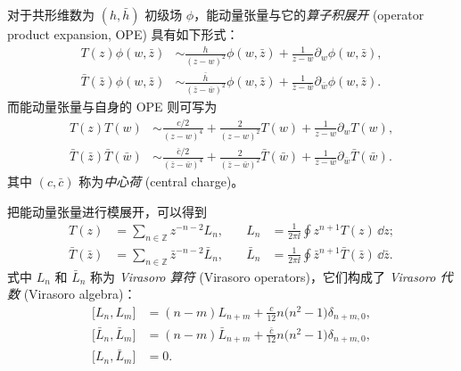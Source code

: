 对于共形维数为 $(h,\bar{h})$ 初级场 $\phi$，能动量张量与它的\emph{算子积展开} (operator product expansion, OPE) 具有如下形式：
\begin{equation}
  \begin{aligned}
    T(z) \phi(w,\bar{z}) &\sim
      \frac{h}{(z-w)^2} \phi(w,\bar{z}) + \frac{1}{z-w} \partial_w\phi(w,\bar{z}), \\
    \bar{T}(\bar{z}) \phi(w,\bar{z}) &\sim
      \frac{\bar{h}}{(\bar{z}-\bar{w})^2} \phi(w,\bar{z}) + \frac{1}{\bar{z}-\bar{w}} \partial_{\bar{w}}\phi(w,\bar{z}).
  \end{aligned}
  \label{eq:t-phi-ope}
\end{equation}
而能动量张量与自身的 OPE 则可写为
\begin{equation}
  \begin{aligned}
    T(z) T(w) &\sim
      \frac{c/2}{(z-w)^4} + \frac{2}{(z-w)^2} T(w) + \frac{1}{z-w} \partial_w T(w), \\
    \bar{T}(\bar{z}) \bar{T}(\bar{w}) &\sim
        \frac{\bar{c}/2}{(\bar{z}-\bar{w})^4}
      + \frac{2}{(\bar{z}-\bar{w})^2} \bar{T}(\bar{w})
      + \frac{1}{\bar{z}-\bar{w}} \partial_{\bar{w}}\bar{T}(\bar{w}).
  \end{aligned}
\end{equation}
其中 $(c,\bar{c})$ 称为\emph{中心荷} (central charge)。

把能动量张量进行模展开，可以得到
\begin{equation}
  \begin{aligned}
    T(z)             &= \sum_{n\in\mathbb{Z}} z^{-n-2} L_n, &\quad
    L_n              &= \frac{1}{2\pi\ii} \oint z^{n+1} T(z) \, \dd z; \\
    \bar{T}(\bar{z}) &= \sum_{n\in\mathbb{Z}} \bar{z}^{-n-2} \bar{L}_n, &\quad
    \bar{L}_n        &= \frac{1}{2\pi\ii} \oint \bar{z}^{n+1} \bar{T}(\bar{z}) \, \dd\bar{z}.
  \end{aligned}
\end{equation}
式中 $L_n$ 和 $\bar{L}_n$ 称为 \emph{Virasoro 算符} (Virasoro operators)，它们构成了 \emph{Virasoro 代数} (Virasoro algebra)：
\begin{equation}
  \begin{aligned}
    \bigl[ L_n, L_m \bigr]
      &= (n-m) L_{n+m} + \frac{c}{12} n \bigl( n^2-1 \bigr) \delta_{n+m,0}, \\
    \bigl[ \bar{L}_n, \bar{L}_m \bigr]
      &= (n-m) \bar{L}_{n+m} + \frac{\bar{c}}{12} n \bigl( n^2-1 \bigr) \delta_{n+m,0}, \\
    \bigl[ L_n, \bar{L}_m \bigr] &= 0.
  \end{aligned}
  \label{eq:virasoro-algebra}
\end{equation}

